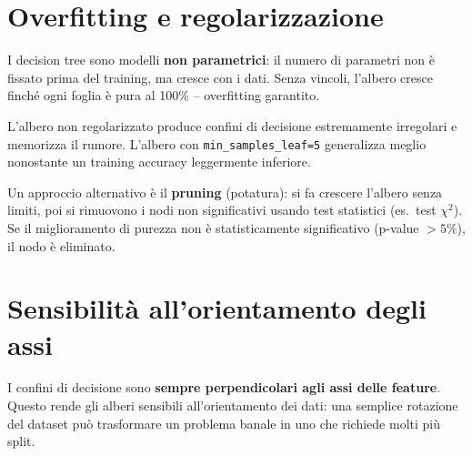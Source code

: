 \section{Overfitting e regolarizzazione}

I decision tree sono modelli \textbf{non parametrici}: il numero di parametri non è fissato prima del training, ma cresce con i dati. Senza vincoli, l'albero cresce finché ogni foglia è pura al 100\% -- overfitting garantito.

\begin{exbox}
L'albero non regolarizzato produce confini di decisione estremamente irregolari e memorizza il rumore. L'albero con \texttt{min\_samples\_leaf=5} generalizza meglio nonostante un training accuracy leggermente inferiore.
\end{exbox}

Un approccio alternativo è il \textbf{pruning} (potatura): si fa crescere l'albero senza limiti, poi si rimuovono i nodi non significativi usando test statistici (es.\ test $\chi^2$). Se il miglioramento di purezza non è statisticamente significativo (p-value $> 5\%$), il nodo è eliminato.

\section{Sensibilità all'orientamento degli assi}

I confini di decisione sono \textbf{sempre perpendicolari agli assi delle feature}. Questo rende gli alberi sensibili all'orientamento dei dati: una semplice rotazione del dataset può trasformare un problema banale in uno che richiede molti più split.

